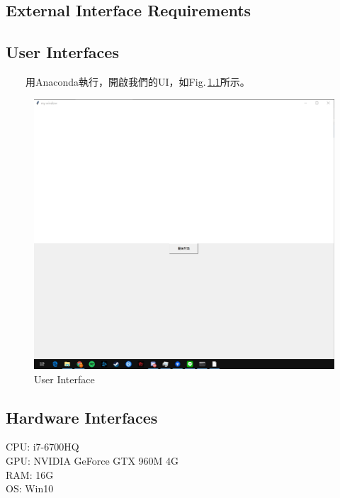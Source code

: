 \documentclass{scrreprt}
\begin{document}
\begin{CJK*}{UTF8}{bsmi}
\chapter{External Interface Requirements}

\section{User Interfaces}
　　用Anaconda執行，開啟我們的UI，如Fig.\,\ref{fig:3.1}所示。
\begin{figure}[h]
\begin{center}
\includegraphics[width=12.5cm]{UI.jpg} 
\end{center} 
\label{fig:3.1} 
\caption{User Interface} 
\end{figure}

\section{Hardware Interfaces}
CPU: i7-6700HQ\\
GPU: NVIDIA GeForce GTX 960M 4G\\
RAM: 16G\\
OS: Win10\\



\end{CJK*}
\end{document}
